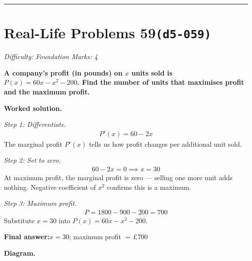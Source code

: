 \documentclass[11pt]{article}
\newcommand{\question}[1]{\par\medskip\noindent\textbf{#1}\par}
\begin{document}
\medskip\hrule

\section*{Real-Life Problems 59\quad\small\texttt{(d5-059)}}
\textit{Difficulty: Foundation \quad\textbar\quad Marks: 4}

\question{A company's profit (in pounds) on \( x \) units sold is \( P(x) = 60x - x^2 - 200 \). Find the number of units that maximises profit and the maximum profit.}

\textbf{Worked solution.}

\textit{Step 1: Differentiate.}
\[\begin{gathered}
P'(x) = 60 - 2x
\end{gathered}\]
The marginal profit \( P'(x) \) tells us how profit changes per additional unit sold.

\textit{Step 2: Set to zero.}
\[\begin{gathered}
60 - 2x = 0 \implies x = 30
\end{gathered}\]
At maximum profit, the marginal profit is zero --- selling one more unit adds nothing. Negative coefficient of \( x^2 \) confirms this is a maximum.

\textit{Step 3: Maximum profit.}
\[\begin{gathered}
P = 1800 - 900 - 200 = 700
\end{gathered}\]
Substitute \( x = 30 \) into \( P(x) = 60x - x^2 - 200 \).

\begin{answerbox}
\textbf{Final answer:}\quad \(\displaystyle  x = 30 \); maximum profit \(\displaystyle  = \pounds 700 \)
\end{answerbox}
\textbf{Diagram.}
\end{document}
